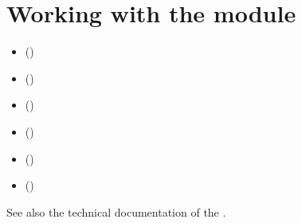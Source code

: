 \documentclass[a4paper,12pt,english]{sphinxhowto}
\begin{document}
\section{Working with the  module}
\label{\detokenize{tutorial:working-with-the-outrankingdigraphs-module}}\label{\detokenize{tutorial:outrankingdigraphs-tutorial-label}}
\begin{sphinxShadowBox}
\begin{itemize}
\item {} 
\label{\detokenize{tutorial:id246}}{\hyperref[\detokenize{tutorial:outranking-digraph-model}]{}} ()

\item {} 
\label{\detokenize{tutorial:id247}}{\hyperref[\detokenize{tutorial:browsing-the-performances}]{}} ()

\item {} 
\label{\detokenize{tutorial:id248}}{\hyperref[\detokenize{tutorial:valuation-semantics}]{}} ()

\item {} 
\label{\detokenize{tutorial:id249}}{\hyperref[\detokenize{tutorial:pairwise-comparisons}]{}} ()

\item {} 
\label{\detokenize{tutorial:id250}}{\hyperref[\detokenize{tutorial:recoding-the-digraph-valuation}]{}} ()

\item {} 
\label{\detokenize{tutorial:id251}}{\hyperref[\detokenize{tutorial:the-strict-outranking-digraph}]{}} ()

\end{itemize}
\end{sphinxShadowBox}

See also the technical documentation of the .
\end{document}
